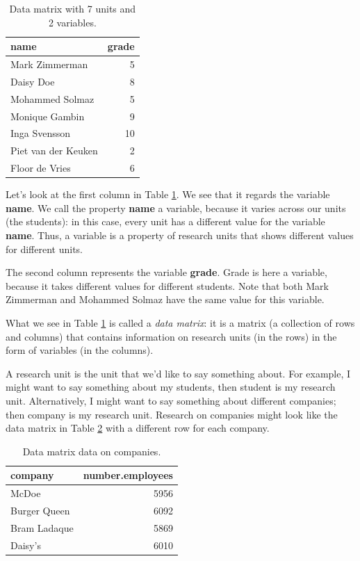 \documentclass[]{report}\usepackage[]{graphicx}\usepackage[]{color}
\begin{document}
\begin{table}[ht]
\centering
\caption{Data matrix with 7 units and 2 variables.} 
\label{tab:data_1}
\begin{tabular}{lr}
  \hline
name & grade \\ 
  \hline
Mark Zimmerman & 5 \\ 
  Daisy Doe & 8 \\ 
  Mohammed Solmaz & 5 \\ 
  Monique Gambin & 9 \\ 
  Inga Svensson & 10 \\ 
  Piet van der Keuken & 2 \\ 
  Floor de Vries & 6 \\ 
   \hline
\end{tabular}
\end{table}


Let's look at the first column in Table \ref{tab:data_1}. We see that it regards the variable \textbf{name}. We call the property \textbf{name} a variable, because it varies across our units (the students): in this case, every unit has a different value for the variable \textbf{name}. Thus, a variable is a property of research units that shows different values for different units. 

The second column represents the variable \textbf{grade}. Grade is here a variable, because it takes different values for different students. Note that both Mark Zimmerman and Mohammed Solmaz have the same value for this variable. 

What we see in Table \ref{tab:data_1} is called a \textit{data matrix}: it is a matrix (a collection of rows and columns) that contains information on research units (in the rows) in the form of variables (in the columns).

A research unit is the unit that we'd like to say something about. For example, I might want to say something about my students, then student is my research unit. Alternatively, I might want to say something about different companies; then company is my research unit. Research on companies might look like the data matrix in Table \ref{tab:data_2} with a different row for each company. 

\begin{table}[ht]
\centering
\caption{Data matrix data on companies.} 
\label{tab:data_2}
\begin{tabular}{lr}
  \hline
company & number.employees \\ 
  \hline
McDoe & 5956 \\ 
  Burger Queen & 6092 \\ 
  Bram Ladaque & 5869 \\ 
  Daisy's & 6010 \\ 
   \hline
\end{tabular}
\end{table}
\end{document}
